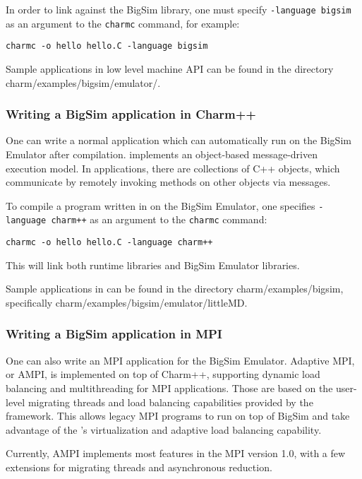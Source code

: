 In order to link against the BigSim library, one must specify
\texttt{-language bigsim} as an argument to the {\tt charmc} command, for
example:

\begin{verbatim}
charmc -o hello hello.C -language bigsim
\end{verbatim}

Sample applications in low level machine API can be found in the directory
charm/examples/bigsim/emulator/.

\subsubsection{Writing a BigSim application in Charm++}

One can write a normal \charmpp{} application which can automatically run on
the BigSim Emulator after compilation. \charmpp{} implements an object-based
message-driven execution model. In \charmpp{} applications, there are
collections of C++ objects, which communicate by remotely invoking methods on
other objects via messages.

To compile a program written in \charmpp{} on the BigSim Emulator, one
specifies \texttt{-language charm++} as an argument to the {\tt charmc}
command:
\begin{verbatim}
charmc -o hello hello.C -language charm++
\end{verbatim}
This will link both \charmpp{} runtime libraries and BigSim Emulator libraries.

Sample applications in \charmpp{} can be found in the directory
charm/examples/bigsim, specifically charm/examples/bigsim/emulator/littleMD.

\subsubsection{Writing a BigSim application in MPI}

One can also write an MPI application for the BigSim Emulator.  Adaptive MPI,
or AMPI, is implemented on top of Charm++, supporting dynamic load balancing
and multithreading for MPI applications. Those are based on the user-level
migrating threads and load balancing capabilities provided by the \charmpp{}
framework. This allows legacy MPI programs to run on top of BigSim \charmpp{}
and take advantage of the \charmpp{}'s virtualization and adaptive load
balancing capability.

Currently, AMPI implements most features in the MPI version 1.0, with a few
extensions for migrating threads and asynchronous reduction.

